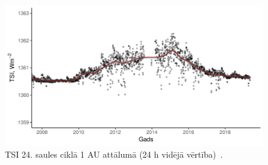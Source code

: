 \begin{figure}[h]
    \centering
    \includegraphics[width=\linewidth]{figures/misc/TSI_8-19.pdf}
    \caption{TSI 24. saules ciklā 1 AU attālumā (24 h vidējā vērtība)~\cite{TSIdata}.}
    \label{fig:TSI_1}
\end{figure}